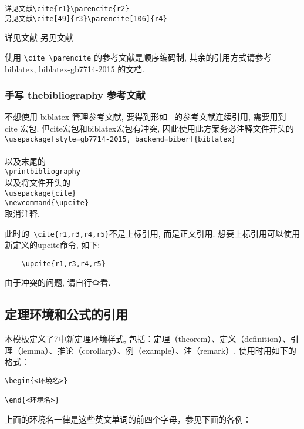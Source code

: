 \begin{lstlisting}
详见文献\cite{r1}\parencite{r2}
另见文献\cite[49]{r3}\parencite[106]{r4}
\end{lstlisting}

详见文献\cite{r1}\parencite{r2}
另见文献\cite[49]{r3}\parencite[106]{r4}

使用 \verb|\cite \parencite| 的参考文献是顺序编码制, 其余的引用方式请参考 biblatex, biblatex-gb7714-2015 的文档.\the\baselineskip

\subsubsection{手写 thebibliography 参考文献\the\baselineskip}
\the\baselineskip
不想使用 biblatex 管理参考文献, 要得到形如~{\cite{r1,r3,r4,r5}} 的参考文献连续引用, 需要用到 cite 宏包. 但cite宏包和biblatex宏包有冲突, 因此使用此方案务必注释文件开头的\the\baselineskip\\
\verb|\usepackage[style=gb7714-2015, backend=biber]{biblatex}|\\
\verb||\\
以及末尾的\\
\verb|\printbibliography|\\
以及将文件开头的\\
\verb|\usepackage{cite}|\\
\verb|\newcommand{\upcite}|\\
取消注释.

此时的~\verb|\cite{r1,r3,r4,r5}|不是上标引用, 而是正文引用. 想要上标引用可以使用新定义的upcite命令, 如下:
\begin{lstlisting}
    \upcite{r1,r3,r4,r5}
\end{lstlisting}
由于冲突的问题, 请自行查看.

\subsection{定理环境和公式的引用}

本模板定义了7中新定理环境样式, 包括：定理（theorem）、定义（definition）、引理（lemma）、推论（corollary）、例（example）、注（remark）. 使用时用如下的格式：
\begin{lstlisting}
\begin{<环境名>}

\end{<环境名>}
\end{lstlisting}

上面的环境名一律是这些英文单词的前四个字母，参见下面的各例：

